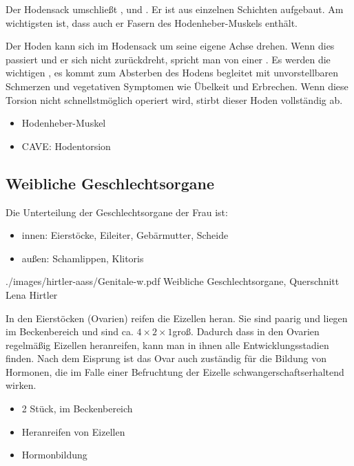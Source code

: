 {%
Der Hodensack umschließt ,  und
. Er ist aus einzelnen Schichten aufgebaut.
Am wichtigsten ist, dass auch er Fasern des
Hodenheber-Muskels enthält.

Der Hoden kann sich im Hodensack um seine eigene Achse
drehen. Wenn dies passiert und er sich nicht zurückdreht,
spricht man von einer . Es werden die
wichtigen , es kommt zum Absterben
des Hodens begleitet mit unvorstellbaren Schmerzen und
vegetativen Symptomen wie Übelkeit und Erbrechen. Wenn diese
Torsion nicht schnellstmöglich operiert wird, stirbt dieser
Hoden vollständig ab. 
}{%
\begin{itemize}
  \item Hodenheber-Muskel
  \item CAVE: Hodentorsion
\end{itemize}
}{}{}{}

\subsection{Weibliche Geschlechtsorgane}

Die Unterteilung der Geschlechtsorgane der Frau ist:
\begin{itemize}
  \item innen: Eierstöcke, Eileiter, Gebärmutter, Scheide
  \item außen: Schamlippen, Klitoris
\end{itemize}

{}
{}
{}
{./images/hirtler-aass/Genitale-w.pdf}
{Weibliche Geschlechtsorgane,
Querschnitt}
{Lena Hirtler}


{%
In den Eierstöcken (Ovarien) reifen die Eizellen heran. Sie
sind paarig und liegen im Beckenbereich und sind ca. $4
\times 2 \times 1$\CM* groß. Dadurch dass in den Ovarien
regelmäßig Eizellen heranreifen, kann man in ihnen alle
Entwicklungsstadien finden. Nach dem Eisprung ist das Ovar
auch zuständig für die Bildung von Hormonen, die im Falle
einer Befruchtung der Eizelle schwangerschaftserhaltend
wirken.
}
{
\begin{itemize}
  \item 2 Stück, im Beckenbereich
  \item Heranreifen von Eizellen
  \item Hormonbildung
\end{itemize}
}{}{}{}


